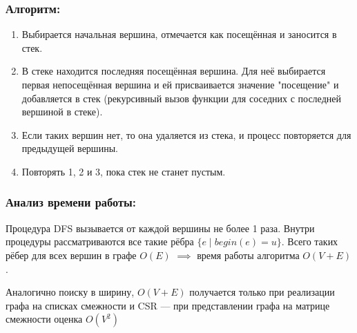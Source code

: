 \subsubsection*{Алгоритм:}
\begin{enumerate}
	\item Выбирается начальная вершина, отмечается как посещённая и заносится в стек.
	\item В стеке находится последняя посещённая вершина. Для неё выбирается первая непосещённая вершина и ей присваивается значение "посещение" и добавляется в стек (рекурсивный вызов функции для соседних с последней вершиной в стеке).
	\item Если таких вершин нет, то она удаляется из стека, и процесс повторяется для предыдущей вершины.
	\item Повторять 1, 2 и 3, пока стек не станет пустым.
\end{enumerate}

\subsubsection*{Анализ времени работы:}
Процедура DFS вызывается от каждой вершины не более 1 раза.
Внутри процедуры рассматриваются все такие рёбра $\{e \mid begin(e)=u\}$.
Всего таких рёбер для всех вершин в графе $O(E)$ $\implies$ время работы алгоритма $O(V+E)$.

\begin{observation}
	Аналогично поиску в ширину, $O(V + E)$ получается только при реализации графа на списках смежности и CSR --- при представлении графа на матрице смежности оценка $O(V^2)$
\end{observation}
